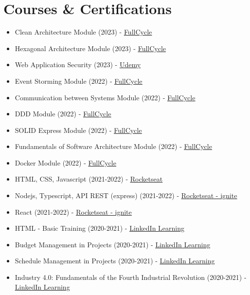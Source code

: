 \documentclass[11pt,a4paper,sans]{moderncv}
\begin{document}
\section{Courses \& Certifications}
 {\begin{itemize}[label=\textbullet]
	  \item Clean Architecture Module (2023) - \underline{\color{blue}\href{https://fullcycle.com}{FullCycle}}
	  \item Hexagonal Architecture Module (2023) - \underline{\color{blue}\href{https://fullcycle.com}{FullCycle}}
	  \item Web Application Security (2023) - \underline{\color{blue}\href{https://udemy.com}{Udemy}}
	  \item Event Storming Module (2022) - \underline{\color{blue}\href{https://fullcycle.com}{FullCycle}}
	  \item Communication between Systems Module (2022) - \underline{\color{blue}\href{https://fullcycle.com}{FullCycle}}
	  \item DDD Module (2022) - \underline{\color{blue}\href{https://fullcycle.com}{FullCycle}}
	  \item SOLID Express Module (2022) - \underline{\color{blue}\href{https://fullcycle.com}{FullCycle}}
	  \item Fundamentals of Software Architecture Module (2022) - \underline{\color{blue}\href{https://fullcycle.com}{FullCycle}}
	  \item Docker Module (2022) - \underline{\color{blue}\href{https://fullcycle.com}{FullCycle}}
	  \item HTML, CSS, Javascript (2021-2022) - \underline{\color{blue}\href{https://rocketseat.com.br}{Rocketseat}}
	  \item Nodejs, Typescript, API REST (express) (2021-2022) - \underline{\color{blue}\href{https://rocketseat.com.br}{Rocketseat - ignite}}
	  \item React (2021-2022) - \underline{\color{blue}\href{https://rocketseat.com.br}{Rocketseat - ignite}}
	  \item HTML - Basic Training (2020-2021) - \underline{\color{blue}\href{https://linkedin.com/learning}{LinkedIn Learning}}
	  \item Budget Management in Projects (2020-2021) - \underline{\color{blue}\href{https://linkedin.com/learning}{LinkedIn Learning}}
	  \item Schedule Management in Projects (2020-2021) - \underline{\color{blue}\href{https://linkedin.com/learning}{LinkedIn Learning}}
	  \item Industry 4.0: Fundamentals of the Fourth Industrial Revolution (2020-2021) - \underline{\color{blue}\href{https://linkedin.com/learning}{LinkedIn Learning}}

\end{itemize}}
\end{document}
